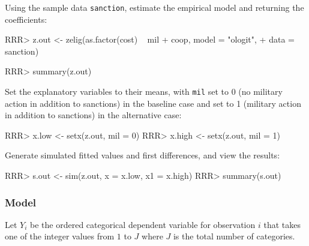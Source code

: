 \begin{enumerate}
Using the sample data \texttt{sanction}, estimate the empirical model and returning the coefficients:
\begin{Schunk}
\begin{Sinput}
RRR>  z.out <- zelig(as.factor(cost) ~ mil + coop, model = "ologit", 
+                  data = sanction)
\end{Sinput}
\end{Schunk}
\begin{Schunk}
\begin{Sinput}
RRR> summary(z.out)
\end{Sinput}
\end{Schunk}
Set the explanatory variables to their means, with {\tt mil} set
to 0 (no military action in addition to sanctions) in the baseline
case and set to 1 (military action in addition to sanctions) in the
alternative case:
\begin{Schunk}
\begin{Sinput}
RRR>  x.low <- setx(z.out, mil = 0)
RRR>  x.high <- setx(z.out, mil = 1)
\end{Sinput}
\end{Schunk}
Generate simulated fitted values and first differences, and view the results:
\begin{Schunk}
\begin{Sinput}
RRR>  s.out <- sim(z.out, x = x.low, x1 = x.high)
RRR>  summary(s.out)
\end{Sinput}
\end{Schunk}
\end{enumerate}

\subsubsection{Model}

Let $Y_i$ be the ordered categorical dependent variable for
observation $i$ that takes one of the integer values from $1$ to $J$
where $J$ is the total number of categories.
  
